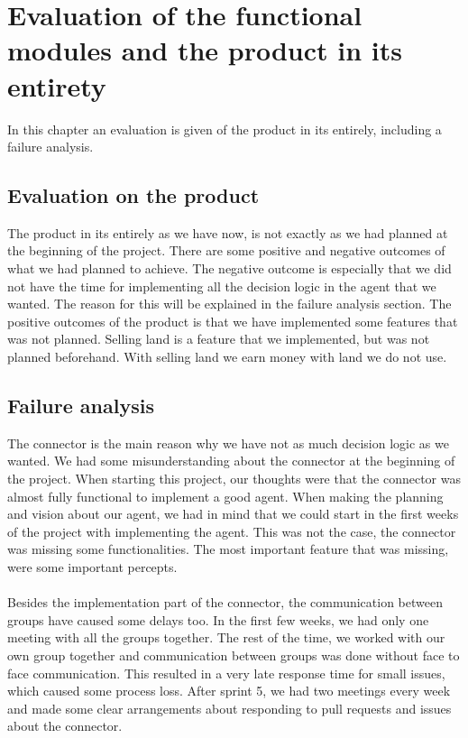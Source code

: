 \chapter{Evaluation of the functional modules and the product in its entirety}
In this chapter an evaluation is given of the product in its entirely, including a failure analysis. 

\section{Evaluation on the product}
The product in its entirely as we have now, is not exactly as we had planned at the beginning of the project. There are some positive and negative outcomes of what we had planned to achieve. The negative outcome is especially that we did not have the time for implementing all the decision logic in the agent that we wanted. The reason for this will be explained in the failure analysis section. The positive outcomes of the product is that we have implemented some features that was not planned. Selling land is a feature that we implemented, but was not planned beforehand. With selling land we earn money with land we do not use.  

\section{Failure analysis}
The connector is the main reason why we have not as much decision logic as we wanted. We had some misunderstanding about the connector at the beginning of the project. When starting this project, our thoughts were that the connector was almost fully functional to implement a good agent. When making the planning and vision about our agent, we had in mind that we could start in the first weeks of the project with implementing the agent.  This was not the case, the connector was missing some functionalities. The most important feature that was missing, were some important percepts. \\\\
Besides the implementation part of the connector, the communication between groups have caused some delays too. In the first few weeks, we had only one meeting with all the groups together. The rest of the time, we worked with our own group together and communication between groups was done without face to face communication. This resulted in a very late response time for small issues, which caused some process loss. After sprint 5, we had two meetings every week and made some clear arrangements about responding to pull requests and issues about the connector.

